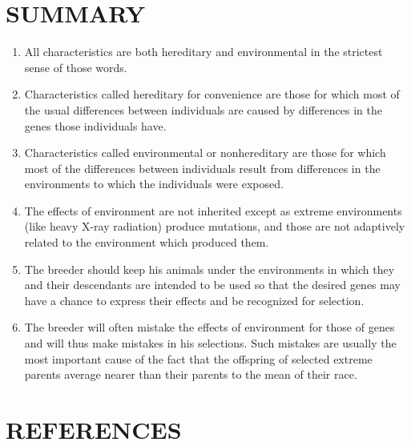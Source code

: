 \section*{SUMMARY}

\begin{enumerate}
\item All characteristics are both hereditary and environmental in the
strictest sense of those words.
\item Characteristics called hereditary for convenience are those for
which most of the usual differences between individuals are caused by
differences in the genes those individuals have.
\item Characteristics called environmental or nonhereditary are those
for which most of the differences between individuals result from differences
in the environments to which the individuals were exposed.
\item The effects of environment are not inherited except as extreme
environments (like heavy X-ray radiation) produce mutations, and
those are not adaptively related to the environment which produced
them.
\item The breeder should keep his animals under the environments in
which they and their descendants are intended to be used so that the
desired genes may have a chance to express their effects and be recognized
for selection.
\item The breeder will often mistake the effects of environment for
those of genes and will thus make mistakes in his selections. Such mistakes
are usually the most important cause of the fact that the offspring
of selected extreme parents average nearer than their parents to the
mean of their race.
\end{enumerate}

\section*{REFERENCES}

